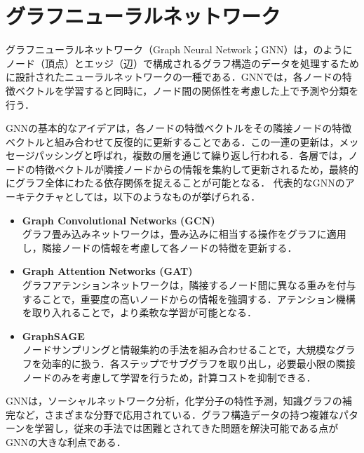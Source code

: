 
\section{グラフニューラルネットワーク}
グラフニューラルネットワーク（Graph Neural Network；GNN）は，のようにノード（頂点）とエッジ（辺）で構成されるグラフ構造のデータを処理するために設計されたニューラルネットワークの一種である．GNNでは，各ノードの特徴ベクトルを学習すると同時に，ノード間の関係性を考慮した上で予測や分類を行う．

GNNの基本的なアイデアは，各ノードの特徴ベクトルをその隣接ノードの特徴ベクトルと組み合わせて反復的に更新することである．この一連の更新は，メッセージパッシングと呼ばれ，複数の層を通じて繰り返し行われる．各層では，ノードの特徴ベクトルが隣接ノードからの情報を集約して更新されるため，最終的にグラフ全体にわたる依存関係を捉えることが可能となる．
代表的なGNNのアーキテクチャとしては，以下のようなものが挙げられる．
\begin{itemize}
  \item \textbf{Graph Convolutional Networks (GCN)}\\
  グラフ畳み込みネットワークは，畳み込みに相当する操作をグラフに適用し，隣接ノードの情報を考慮して各ノードの特徴を更新する．
  \item \textbf{Graph Attention Networks (GAT)}\\
  グラフアテンションネットワークは，隣接するノード間に異なる重みを付与することで，重要度の高いノードからの情報を強調する．アテンション機構を取り入れることで，より柔軟な学習が可能となる．
  \item \textbf{GraphSAGE}\\
  ノードサンプリングと情報集約の手法を組み合わせることで，大規模なグラフを効率的に扱う．各ステップでサブグラフを取り出し，必要最小限の隣接ノードのみを考慮して学習を行うため，計算コストを抑制できる．
\end{itemize}

GNNは，ソーシャルネットワーク分析，化学分子の特性予測，知識グラフの補完など，さまざまな分野で応用されている．グラフ構造データの持つ複雑なパターンを学習し，従来の手法では困難とされてきた問題を解決可能である点がGNNの大きな利点である．


\newpage
